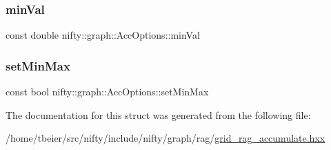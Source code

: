 \mbox{\label{structnifty_1_1graph_1_1AccOptions_aa798ef8ea78550c5a80de88d34be1914}} 
\subsubsection{\texorpdfstring{min\+Val}{minVal}}
{\footnotesize\ttfamily const double nifty\+::graph\+::\+Acc\+Options\+::min\+Val}

\mbox{\label{structnifty_1_1graph_1_1AccOptions_ae8a2b6438127dc9241b04df430d7e531}} 
\subsubsection{\texorpdfstring{set\+Min\+Max}{setMinMax}}
{\footnotesize\ttfamily const bool nifty\+::graph\+::\+Acc\+Options\+::set\+Min\+Max}



The documentation for this struct was generated from the following file\+:\begin{DoxyCompactItemize}
\item 
/home/tbeier/src/nifty/include/nifty/graph/rag/\hyperlink{grid__rag__accumulate_8hxx}{grid\+\_\+rag\+\_\+accumulate.\+hxx}\end{DoxyCompactItemize}
